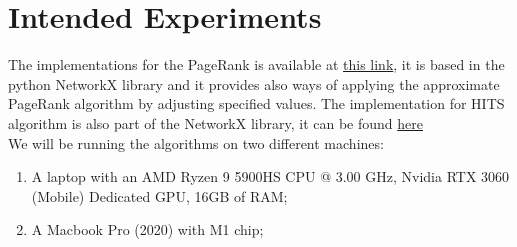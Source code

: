 \section{Intended Experiments}
    The implementations for the PageRank is available at \href{https://networkx.org/documentation/stable/reference/algorithms/generated/networkx.algorithms.link_analysis.pagerank_alg.pagerank.html}{\color{blue}this link}, 
    it is based in the python NetworkX library and it provides also ways of applying the approximate PageRank algorithm by adjusting specified values. 
    The implementation for HITS algorithm is also part of the NetworkX library, it can be found \href{https://networkx.org/documentation/stable/reference/algorithms/generated/networkx.algorithms.link_analysis.hits_alg.hits.html}{\color{blue}here}
    \\
    We will be running the algorithms on two different machines:
    \begin{enumerate}
        \item A laptop with an AMD Ryzen 9 5900HS CPU @ 3.00 GHz, Nvidia RTX 3060 (Mobile) Dedicated GPU, 16GB of RAM;
        \item A Macbook Pro (2020) with M1 chip;
    \end{enumerate}
